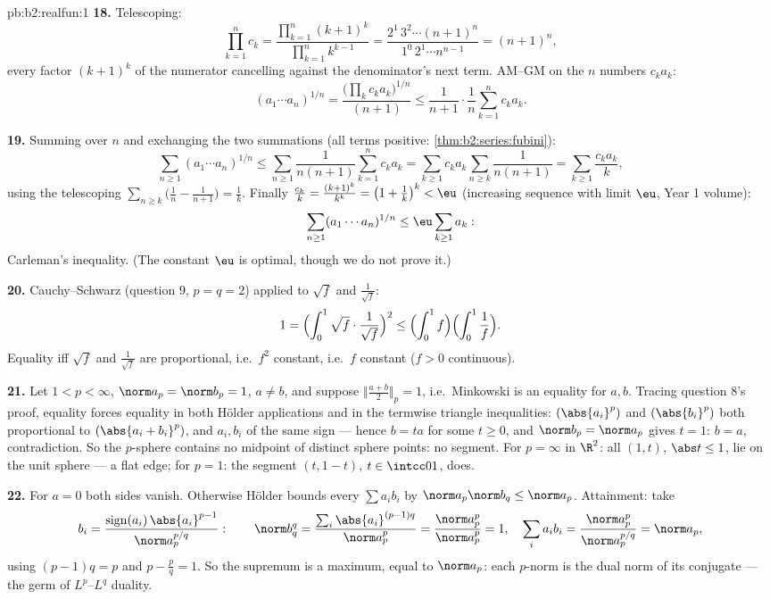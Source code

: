 \begin{solution}{pb:b2:realfun:1}
\textbf{18.} Telescoping:
\[
\prod_{k=1}^{n}c_k = \frac{\prod_{k=1}^n(k+1)^k}
{\prod_{k=1}^{n}k^{k-1}}
= \frac{2^1\,3^2\cdots(n+1)^n}{1^0\,2^1\cdots n^{n-1}}
= (n+1)^n,
\]
every factor $(k+1)^k$ of the numerator cancelling against the
denominator's next term. AM--GM on the $n$ numbers $c_ka_k$:
\[
(a_1\cdots a_n)^{1/n} =
\frac{\bigl(\prod_k c_ka_k\bigr)^{1/n}}{(n+1)}
\leq \frac{1}{n+1}\cdot\frac1n\sum_{k=1}^{n}c_ka_k .
\]

\textbf{19.} Summing over $n$ and exchanging the two summations
(all terms positive: \cref{thm:b2:series:fubini}):
\[
\sum_{n\geq1}(a_1\cdots a_n)^{1/n}
\leq \sum_{n\geq1}\frac{1}{n(n+1)}\sum_{k=1}^{n}c_ka_k
= \sum_{k\geq1}c_ka_k\sum_{n\geq k}\frac1{n(n+1)}
= \sum_{k\geq1}\frac{c_ka_k}{k},
\]
using the telescoping $\sum_{n\geq k}\bigl(\frac1n -
\frac1{n+1}\bigr) = \frac1k$. Finally $\frac{c_k}k =
\frac{(k+1)^k}{k^k} = \bigl(1 + \frac1k\bigr)^k < \eu$
(increasing sequence with limit $\eu$, Year 1 volume):
\[
\sum_{n\geq1}(a_1\cdots a_n)^{1/n} \leq
\eu\sum_{k\geq1}a_k :
\]
Carleman's inequality. (The constant $\eu$ is optimal, though we
do not prove it.)

\textbf{20.} Cauchy--Schwarz (question 9, $p = q = 2$) applied
to $\sqrt f$ and $\frac1{\sqrt f}$:
\[
1 = \Bigl(\int_0^1\sqrt f\cdot\frac{1}{\sqrt f}\Bigr)^{2}
\leq \Bigl(\int_0^1 f\Bigr)\Bigl(\int_0^1\frac1f\Bigr).
\]
Equality iff $\sqrt f$ and $\frac1{\sqrt f}$ are proportional,
i.e.\ $f^2$ constant, i.e.\ $f$ constant ($f > 0$ continuous).

\textbf{21.} Let $1 < p < \infty$, $\norm a_p = \norm b_p = 1$,
$a \neq b$, and suppose $\bigl\Vert\frac{a+b}2\bigr\Vert_p = 1$,
i.e.\ Minkowski is an equality for $a, b$. Tracing question 8's
proof, equality forces equality in both H\"older applications
and in the termwise triangle inequalities: $(\abs{a_i}^p)$ and
$(\abs{b_i}^p)$ both proportional to $(\abs{a_i + b_i}^p)$, and
$a_i, b_i$ of the same sign --- hence $b = ta$ for some $t \geq
0$, and $\norm b_p = \norm a_p$ gives $t = 1$: $b = a$,
contradiction. So the $p$-sphere contains no midpoint of
distinct sphere points: no segment. For $p = \infty$ in $\R^2$:
all $(1, t)$, $\abs t \leq 1$, lie on the unit sphere --- a flat
edge; for $p = 1$: the segment $(t, 1 - t)$, $t \in \intcc01$,
does.

\textbf{22.} For $a = 0$ both sides vanish. Otherwise H\"older
bounds every $\sum a_ib_i$ by $\norm a_p\norm b_q \leq \norm
a_p$. Attainment: take
\[
b_i = \frac{\operatorname{sign}(a_i)\,\abs{a_i}^{p-1}}
{\norm a_p^{p/q}} :
\qquad
\norm b_q^q = \frac{\sum_i\abs{a_i}^{(p-1)q}}{\norm a_p^{p}}
= \frac{\norm a_p^p}{\norm a_p^p} = 1,
\quad
\sum_ia_ib_i = \frac{\norm a_p^p}{\norm a_p^{p/q}} =
\norm a_p ,
\]
using $(p-1)q = p$ and $p - \frac pq = 1$. So the supremum is a
maximum, equal to $\norm a_p$: each $p$-norm is the dual norm of
its conjugate --- the germ of $L^p$--$L^q$ duality.


\end{solution}
